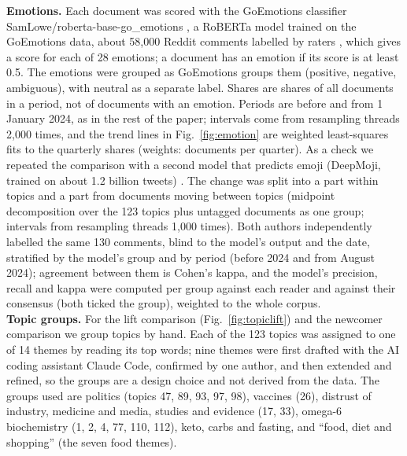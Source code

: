 {\textbf{Emotions.} Each document was scored with the GoEmotions classifier SamLowe/roberta-base-go\_emotions \cite{lowe2023goemotionsmodel}, a RoBERTa model \cite{liu2019roberta} trained on the GoEmotions data, about 58{,}000 Reddit comments labelled by raters \cite{demszky2020goemotions}, which gives a score for each of 28 emotions; a document has an emotion if its score is at least 0.5. The emotions were grouped as GoEmotions groups them (positive, negative, ambiguous), with neutral as a separate label. Shares are shares of all documents in a period, not of documents with an emotion. Periods are before and from 1 January 2024, as in the rest of the paper; intervals come from resampling threads 2{,}000 times, and the trend lines in Fig.~\ref{fig:emotion} are weighted least-squares fits to the quarterly shares (weights: documents per quarter). As a check we repeated the comparison with a second model that predicts emoji (DeepMoji, trained on about 1.2 billion tweets) \cite{felbo2017deepmoji}. The change was split into a part within topics and a part from documents moving between topics (midpoint decomposition \cite{kitagawa1955} over the 123 topics plus untagged documents as one group; intervals from resampling threads 1{,}000 times). Both authors independently labelled the same 130 comments, blind to the model's output and the date, stratified by the model's group and by period (before 2024 and from August 2024); agreement between them is Cohen's kappa, and the model's precision, recall and kappa were computed per group against each reader and against their consensus (both ticked the group), weighted to the whole corpus. \\
\textbf{Topic groups.} For the lift comparison (Fig.~\ref{fig:topiclift}) and the newcomer comparison we group topics by hand. Each of the 123 topics was assigned to one of 14 themes by reading its top words; nine themes were first drafted with the AI coding assistant Claude Code, confirmed by one author, and then extended and refined, so the groups are a design choice and not derived from the data. The groups used are politics (topics 47, 89, 93, 97, 98), vaccines (26), distrust of industry, medicine and media, studies and evidence (17, 33), omega-6 biochemistry (1, 2, 4, 77, 110, 112), keto, carbs and fasting, and ``food, diet and shopping'' (the seven food themes). \\
}
